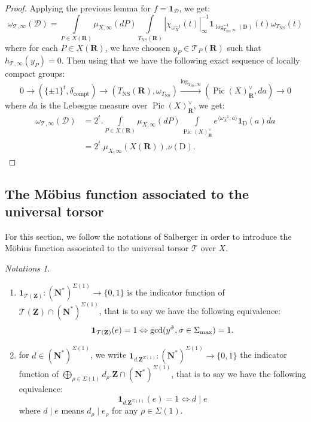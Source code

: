 \documentclass{proc-l}
\newcommand{\R}{\mathbf{R}}
\newcommand{\Z}{\mathbf{Z}}
\newcommand{\N}{\mathbf{N}}
\DeclareMathOperator{\Pic}{Pic}
\DeclareMathOperator{\NS}{NS}
\newcommand{\stackT}{\mathcal{T}}
\newcommand{\w}{\omega}
\theoremstyle{definition}
\theoremstyle{remark}
\newtheorem*{Notations}{Notations}
\numberwithin{equation}{section}
\begin{document}
\begin{proof}
   Applying the previous lemma for $f = \mathbf{1}_{\mathcal{D}}$, we get:
    $$\w_{\stackT,\infty}(\mathcal{D}) =  \int\limits_{P \in X(\R)}  \mu_{X,\infty}(dP) \int\limits_{T_{\NS}(\R)} | \chi_{\w_{X}^{-1}}(t) |_{\infty}^{-1} \mathbf{1}_{\log_{T_{\NS},\infty}^{-1}(\mathrm{D})}(t) \w_{T_{\NS}}(t) $$where for each $P \in X(\R)$, we have choosen $y_P \in \stackT_P(\R)$ such that $h_{\stackT,\infty}(y_P) = 0$.
    Then using that we have the following exact sequence of locally compact groups:
    $$0 \rightarrow (\{ \pm 1 \}^t,\delta_{\text{compt}}) \rightarrow (T_{\NS}(\R),\w_{T_{\NS}}) \xrightarrow{\log_{T_{\NS},\infty}} (\Pic(X)^{\vee}_{\R},da) \rightarrow 0 $$where $da$ is the Lebesgue measure over $\Pic(X)^{\vee}_{\R}$, we get:
    \begin{align*}
        \w_{\stackT,\infty}(\mathcal{D}) &= 2^t . \int\limits_{P \in X(\R)}  \mu_{X,\infty}(dP) \int\limits_{\Pic(X)^{\vee}_{\R}} e^{\langle \w_{X}^{-1},a \rangle} \mathbf{1}_{\mathrm{D}}(a) da \\
        &= 2^t . \mu_{X,\infty}(X(\R)) . \nu(\mathrm{D}) .
    \end{align*}
    

\end{proof}





\subsection{The Möbius function associated to the universal torsor}

For this section, we follow the notations of Salberger \cite[Notations 11.8]{salberger_torsor} in order to introduce the Möbius function associated to the universal torsor $\stackT$ over $X$.

\begin{Notations}
\begin{enumerate}
    \item $\mathbf{1}_{\stackT(\Z)} : (\N^*)^{\Sigma(1)} \rightarrow \{0,1\}$ is the indicator function of $\stackT(\Z) \cap (\N^*)^{\Sigma(1)}$, that is to say we have the following equivalence: $$\mathbf{1}_{\stackT(\Z)}(e) = 1 \Leftrightarrow  \gcd(y^{\Tilde{\sigma}}, \sigma \in \Sigma_{\max}) = 1 .$$
    \item for $d \in (\N^*)^{\Sigma(1)}$, we write $\mathbf{1}_{d.\Z^{\Sigma(1)}} : (\N^*)^{\Sigma(1)} \rightarrow \{0,1\}$ the indicator function of $\bigoplus\limits_{\rho \in \Sigma(1)} d_{\rho}.\Z \cap (\N^*)^{\Sigma(1)}$, that is to say we have the following equivalence: $$\mathbf{1}_{d.\Z^{\Sigma(1)}}(e) = 1 \Leftrightarrow  d \mid e $$where $d \mid e$ means $d_{\rho} \mid e_{\rho}$ for any $\rho \in \Sigma(1)$. 
\end{enumerate}
\end{Notations}
\end{document}
